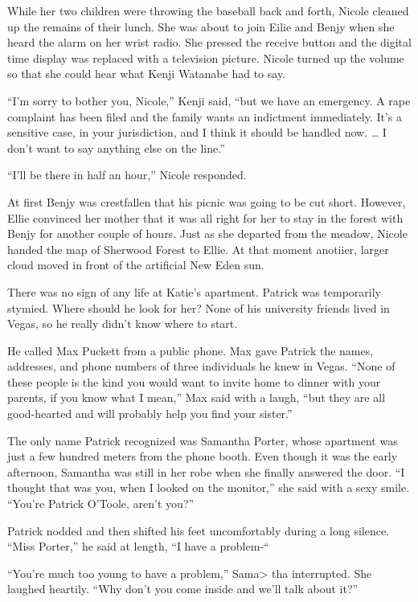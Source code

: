 \documentclass[]{article}
\begin{document}
{While her two children were throwing the baseball back and forth, Nicole cleaned up the remains of their lunch.  She was about to join Eilie and Benjy when she heard the alarm on her wrist radio.  She pressed the receive button and the digital time display was replaced with a television picture.  Nicole turned up the volume so that she could hear what Kenji Watanabe had to say.

“I’m sorry to bother you, Nicole,” Kenji said, “but we have an emergency.  A rape complaint has been filed and the family wants an indictment immediately.  It’s a sensitive case, in your jurisdiction, and I think it should be handled now.  … I don’t want to say anything else on the line.”

“I’ll be there in half an hour,” Nicole responded.

At first Benjy was crestfallen that his picnic was going to be cut short.  However, Ellie convinced her mother that it was all right for her to stay in the forest with Benjy for another couple of hours.  Just as she departed from the meadow, Nicole handed the map of Sherwood Forest to Ellie.  At that moment anotiier, larger cloud moved in front of the artificial New Eden sun.

There was no sign of any life at Katie’s apartment.  Patrick was temporarily stymied.  Where should he look for her? None of his university friends lived in Vegas, so he really didn’t know where to start.

He called Max Puckett from a public phone.  Max gave Patrick the names, addresses, and phone numbers of three individuals he knew in Vegas.  “None of these people is the kind you would want to invite home to dinner with your parents, if you know what I mean,” Max said with a laugh, “but they are all good-hearted and will probably help you find your sister.”

The only name Patrick recognized was Samantha Porter, whose apartment was just a few hundred meters from the phone booth.  Even though it was the early afternoon, Samantha was still in her robe when she finally answered the door.  “I thought that was you, when I looked on the monitor,” she said with a sexy smile.  “You’re Patrick O’Toole, aren’t you?”

Patrick nodded and then shifted his feet uncomfortably during a long silence.  “Miss Porter,” he said at length, “I have a problem-“

“You’re much too young to have a problem,” Sama> tha interrupted.  She laughed heartily.  “Why don’t you come inside and we’ll talk about it?”

}
\end{document}
